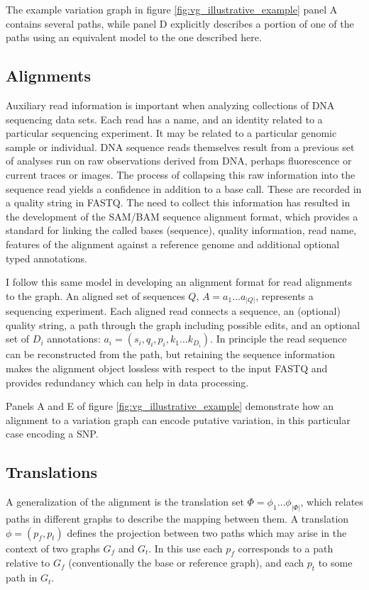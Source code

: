 The example variation graph in figure \ref{fig:vg_illustrative_example} panel A contains several paths, while panel D explicitly describes a portion of one of the paths using an equivalent model to the one described here.

\subsection{Alignments}
\label{sec:alignments}

Auxiliary read information is important when analyzing collections of DNA sequencing data sets.
Each read has a name, and an identity related to a particular sequencing experiment.
It may be related to a particular genomic sample or individual.
DNA sequence reads themselves result from a previous set of analyses run on raw observations derived from DNA, perhaps fluorescence or current traces or images.
The process of collapsing this raw information into the sequence read yields a confidence in addition to a base call.
These are recorded in a quality string in FASTQ.
The need to collect this information has resulted in the development of the SAM/BAM sequence alignment format, which provides a standard for linking the called bases (sequence), quality information, read name, features of the alignment against a reference genome and additional optional typed annotations.

I follow this same model in developing an alignment format for read alignments to the graph.
An aligned set of sequences $Q$, $A = a_1 \ldots a_{|Q|}$, represents a sequencing experiment.
Each aligned read connects a sequence, an (optional) quality string, a path through the graph including possible edits, and an optional set of $D_i$ annotations: $a_i = (s_i, q_i, p_i, k_1\ldots k_{D_i})$.
In principle the read sequence can be reconstructed from the path, but retaining the sequence information makes the alignment object lossless with respect to the input FASTQ and provides redundancy which can help in data processing.

Panels A and E of figure \ref{fig:vg_illustrative_example} demonstrate how an alignment to a variation graph can encode putative variation, in this particular case encoding a SNP.

\subsection{Translations}
\label{sec:translation}

A generalization of the alignment is the translation set $\Phi = \phi_1 \ldots \phi_{|\Phi|}$, which relates paths in different graphs to describe the mapping between them.
A translation $\phi = (p_f, p_t)$ defines the projection between two paths which may arise in the context of two graphs $G_f$ and $G_t$.
In this use each $p_f$ corresponds to a path relative to $G_f$ (conventionally the base or reference graph), and each $p_t$ to some path in $G_t$.

